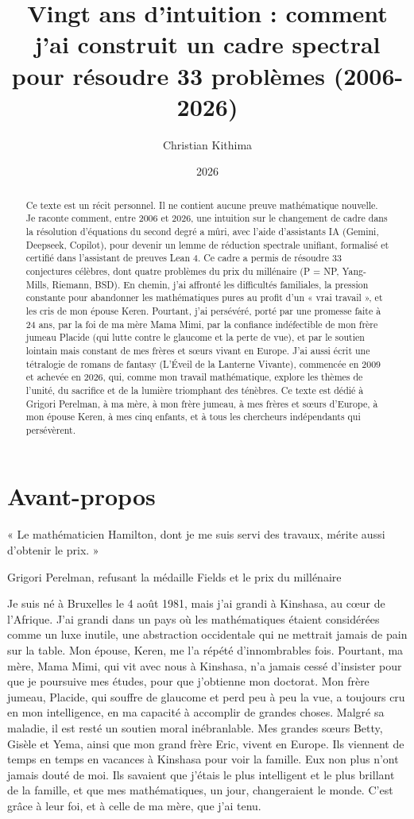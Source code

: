 \documentclass[11pt,a4paper]{article}
\title{Vingt ans d'intuition : comment j'ai construit un cadre spectral pour résoudre 33 problèmes (2006-2026)}
\author{Christian Kithima}
\date{2026}
\begin{document}
\maketitle

\begin{abstract}
Ce texte est un récit personnel. Il ne contient aucune preuve mathématique nouvelle. Je raconte comment, entre 2006 et 2026, une intuition sur le changement de cadre dans la résolution d'équations du second degré a mûri, avec l'aide d'assistants IA (Gemini, Deepseek, Copilot), pour devenir un lemme de réduction spectrale unifiant, formalisé et certifié dans l'assistant de preuves Lean 4. Ce cadre a permis de résoudre 33 conjectures célèbres, dont quatre problèmes du prix du millénaire (P = NP, Yang-Mills, Riemann, BSD). En chemin, j'ai affronté les difficultés familiales, la pression constante pour abandonner les mathématiques pures au profit d'un « vrai travail », et les cris de mon épouse Keren. Pourtant, j'ai persévéré, porté par une promesse faite à 24 ans, par la foi de ma mère Mama Mimi, par la confiance indéfectible de mon frère jumeau Placide (qui lutte contre le glaucome et la perte de vue), et par le soutien lointain mais constant de mes frères et sœurs vivant en Europe. J'ai aussi écrit une tétralogie de romans de fantasy (L'Éveil de la Lanterne Vivante), commencée en 2009 et achevée en 2026, qui, comme mon travail mathématique, explore les thèmes de l'unité, du sacrifice et de la lumière triomphant des ténèbres. Ce texte est dédié à Grigori Perelman, à ma mère, à mon frère jumeau, à mes frères et sœurs d'Europe, à mon épouse Keren, à mes cinq enfants, et à tous les chercheurs indépendants qui persévèrent.
\end{abstract}

\section*{Avant-propos}

\epigraph{« Le mathématicien Hamilton, dont je me suis servi des travaux, mérite aussi d'obtenir le prix. »}{Grigori Perelman, refusant la médaille Fields et le prix du millénaire}

Je suis né à Bruxelles le 4 août 1981, mais j'ai grandi à Kinshasa, au cœur de l'Afrique. J'ai grandi dans un pays où les mathématiques étaient considérées comme un luxe inutile, une abstraction occidentale qui ne mettrait jamais de pain sur la table. Mon épouse, Keren, me l'a répété d'innombrables fois. Pourtant, ma mère, Mama Mimi, qui vit avec nous à Kinshasa, n'a jamais cessé d'insister pour que je poursuive mes études, pour que j'obtienne mon doctorat. Mon frère jumeau, Placide, qui souffre de glaucome et perd peu à peu la vue, a toujours cru en mon intelligence, en ma capacité à accomplir de grandes choses. Malgré sa maladie, il est resté un soutien moral inébranlable. Mes grandes sœurs Betty, Gisèle et Yema, ainsi que mon grand frère Eric, vivent en Europe. Ils viennent de temps en temps en vacances à Kinshasa pour voir la famille. Eux non plus n'ont jamais douté de moi. Ils savaient que j'étais le plus intelligent et le plus brillant de la famille, et que mes mathématiques, un jour, changeraient le monde. C'est grâce à leur foi, et à celle de ma mère, que j'ai tenu.
\end{document}
